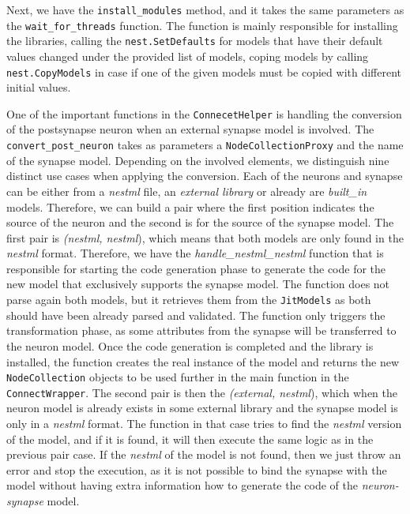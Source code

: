 Next, we have the \texttt{install\_modules} method, and it takes the same parameters as the  \texttt{wait\_for\_threads} function. The function is mainly responsible for installing the libraries, calling the \texttt{nest.SetDefaults} for models that have their default values changed under the provided list of models, coping models by calling \texttt{nest.CopyModels} in case if one of the given models must be copied with different initial values.

One of the important functions in the \texttt{ConnecetHelper} is handling the conversion of the postsynapse neuron when an external synapse model is involved. The \texttt{convert\_post\_neuron} takes as parameters a \texttt{NodeCollectionProxy} and the name of the synapse model. Depending on the involved elements, we distinguish nine distinct use cases when applying the conversion. Each of the neurons and synapse can be either from a \emph{nestml} file, an \emph{external library} or already are \emph{built\_in} models. Therefore, we can build a pair where the first position indicates the source of the neuron and the second is for the source of the synapse model. The first pair is \emph{(nestml, nestml}), which means that both models are only found in the \emph{nestml} format. Therefore, we have the  \emph{handle\_nestml\_nestml} function that is responsible for starting the code generation phase to generate the code for the new model that exclusively supports the synapse model. The function does not parse again both models, but it retrieves them from the \texttt{JitModels} as both should have been already parsed and validated. The function only triggers the transformation phase, as some attributes from the synapse will be transferred to the neuron model. Once the code generation is completed and the library is installed, the function creates the real instance of the model and returns the new \texttt{NodeCollection} objects to be used further in the main function in the \texttt{ConnectWrapper}. The second pair is then the \emph{(external, nestml}), which when the neuron model is already exists in some external library and the synapse model is only in a \emph{nestml} format. The function in that case tries to find the \emph{nestml} version of the model, and if it is found, it will then execute the same logic as in the previous pair case. If the \emph{nestml} of the model is not found, then we just throw an error and stop the execution, as it is not possible to bind the synapse with the model without having extra information how to generate the code of the \emph{neuron-synapse} model. 

